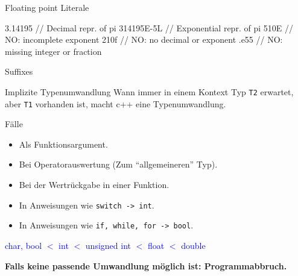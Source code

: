 \ifnum\conditionmacro=1 \documentclass[handout,usenames,dvipsnames]{beamer}\fi
\begin{document}

\begin{frame}[fragile]{Floating point Literale}
\begin{TPCpp}
3.14195    // Decimal repr. of pi
314195E-5L // Exponential repr. of pi
510E       // NO: incomplete exponent
210f       // NO: no decimal or exponent
.e55       // NO: missing integer or fraction
\end{TPCpp}
\begin{block}{Suffixes}
\end{block}
\end{frame}


\begin{frame}[fragile]{Implizite Typenumwandlung}
Wann immer in einem Kontext Typ \verb+T2+ erwartet, aber \verb+T1+ vorhanden ist, macht c++ eine Typenumwandlung.

\begin{block}{Fälle}
\begin{itemize}
\item Als Funktionsargument.
\item Bei Operatorauswertung (Zum ``allgemeineren'' Typ).
\item Bei der Wertrückgabe in einer Funktion.
\item In Anweisungen wie \verb+switch -> int+.
\item In Anweisungen wie \verb+if, while, for -> bool+.
\end{itemize}
\end{block}

\begin{center}
\textcolor{blue}{char, bool $<$ int $<$ unsigned int $<$ float $<$ double}
\end{center}

\textbf{Falls keine passende Umwandlung möglich ist: Programmabbruch.}

\end{frame}
\end{document}
